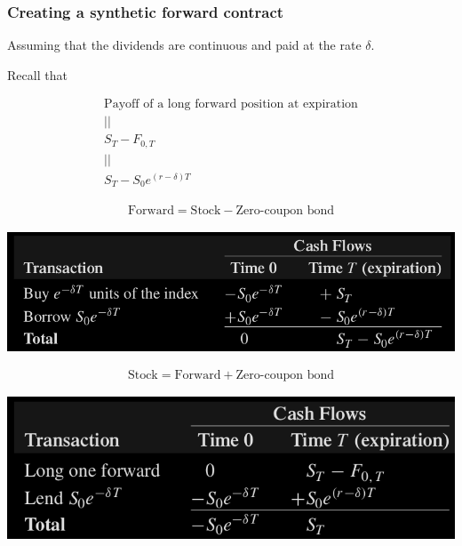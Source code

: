 \begin{frame}[fragile,t]
	\frametitle{Creating a synthetic forward contract}
	\begin{center}
		Assuming that the dividends are continuous and paid at the rate $\delta$. \\
		\bigskip
		\bigskip

		Recall that

		\begin{gather*}
			\text{Payoff of a long forward position at expiration} \\
			||                                                     \\
			S_T - F_{0,T}                                          \\
			||                                                     \\
			S_T - S_0 e^{(r-\delta)T}
		\end{gather*}
	\end{center}

\end{frame}
\begin{frame}[fragile,t]
\begin{center}
	\begin{align*}
		\text{Forward} = \text{Stock} - \text{Zero-coupon bond}
	\end{align*}

	\includegraphics[scale=0.25]{figs/Table-5-3.png}
\end{center}
\end{frame}
\begin{frame}[fragile,t]
\begin{center}
	\begin{align*}
		\text{Stock} = \text{Forward} + \text{Zero-coupon bond}
	\end{align*}

	\includegraphics[scale=0.25]{figs/Table-5-4.png}
\end{center}
\end{frame}
